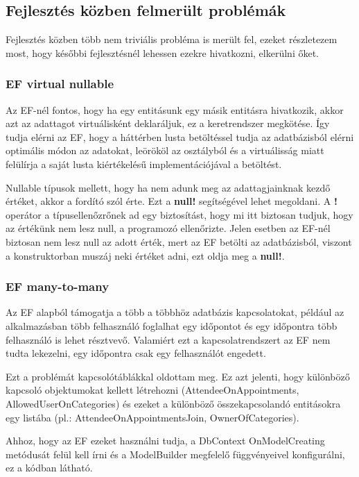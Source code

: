 \subsection{Fejlesztés közben felmerült problémák}
\label{sec:devProblems}
Fejlesztés közben több nem triviális probléma is merült fel, ezeket részletezem most, hogy későbbi fejlesztésnél lehessen ezekre hivatkozni, elkerülni őket.

\subsubsection{EF virtual nullable}

Az EF-nél fontos, hogy ha egy entitásunk egy másik entitásra hivatkozik, akkor azt az adattagot virtuálisként deklaráljuk, ez a keretrendszer megkötése. Így tudja elérni az EF, hogy a háttérben lusta betöltéssel tudja az adatbázisból elérni optimális módon az adatokat, leörököl az osztályból és a virtuálisság miatt felülírja a saját lusta kiértékelésű implementációjával a betöltést.

Nullable típusok mellett, hogy ha nem adunk meg az adattagjainknak kezdő értéket, akkor a fordító szól érte. Ezt a \textbf{null!} segítségével lehet megoldani. A \textbf{!} operátor a típusellenőzrőnek ad egy biztosítást, hogy mi itt biztosan tudjuk, hogy az értékünk nem lesz null, a programozó ellenőrizte. Jelen esetben az EF-nél biztosan nem lesz null az adott érték, mert az EF betölti az adatbázisból, viszont a konstruktorban muszáj neki értéket adni, ezt oldja meg a \textbf{null!}.

\subsubsection{EF many-to-many}

Az EF alapból támogatja a több a többhöz adatbázis kapcsolatokat, például az alkalmazásban több felhasználó foglalhat egy időpontot és egy időpontra több felhasználó is lehet résztvevő. Valamiért ezt a kapcsolatrendszert az EF nem tudta lekezelni, egy időpontra csak egy felhasználót engedett.

Ezt a problémát kapcsolótáblákkal oldottam meg. Ez azt jelenti, hogy különböző kapcsoló objektumokat kellett létrehozni (AttendeeOnAppointments, AllowedUserOnCategories) és ezeket a különböző összekapcsolandó entitásokra egy listába (pl.: AttendeeOnAppointmentsJoin, OwnerOfCategories).

Ahhoz, hogy az EF ezeket használni tudja, a DbContext OnModelCreating metódusát felül kell írni és a ModelBuilder megfelelő függvényeivel konfigurálni, ez a kódban látható.


